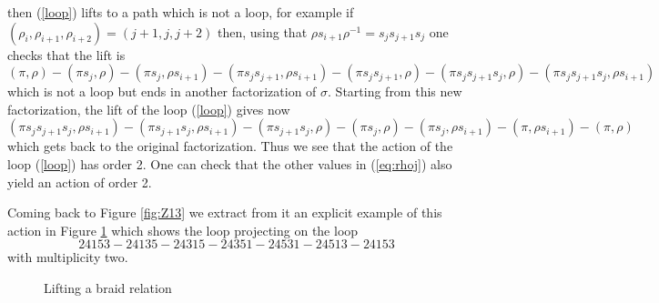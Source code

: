 \documentclass[11pt,a4paper]{amsart}
\theoremstyle{contraction}
\begin{document}
\begin{itemize}
   then (\ref{loop}) lifts to a path which is not a loop, for example if $(\rho_{i},\rho_{i+1},\rho_{i+2})=(j+1,j,j+2)$ then, using that $\rho s_{i+1}\rho^{-1}=s_{j}s_{j+1}s_{j}$ one checks that the   lift is
  $$(\pi,\rho)-(\pi s_j,\rho) -(\pi s_j,\rho s_{i+1})-(\pi s_js_{j+1},\rho s_{i+1})
  -( \pi s_js_{j+1} ,\rho )-(\pi s_{j}s_{j+1}s_{j},\rho  )-(\pi s_{j}s_{j+1}s_{j},\rho s_{i+1} )$$ 
  which is not a loop but ends in another factorization of $\sigma$. Starting from this new factorization, the lift of the loop (\ref{loop}) gives now
  $$(\pi s_{j}s_{j+1}s_{j},\rho s_{i+1} )-(\pi s_{j+1}s_{j},\rho s_{i+1}  ) -
 (\pi s_{j+1}s_{j},\rho   )-(\pi s_j,\rho)
  -(\pi s_j,\rho s_{i+1})-(\pi ,\rho s_{i+1})-(\pi,\rho)$$
  which gets back to the original factorization. Thus we see that the action of the loop 
  (\ref{loop}) has order 2. One can check that the  other values in (\ref{eq:rhoj}) also yield an action of order 2.
\end{itemize}
 
Coming back to Figure \ref{fig:Z13} 
we extract from it  an explicit example of this action in 
Figure \ref{fig:braid} which shows the loop projecting on the loop 
$$24153-24135-24315-24351-24531-24513-24153$$
with multiplicity two.

\begin{figure}
\caption{Lifting a braid relation}
\label{fig:braid}
\end{figure}
\end{document}
